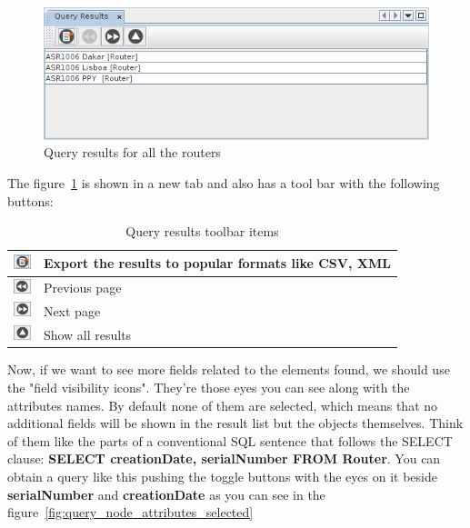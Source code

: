 \documentclass[a4paper]{article}
\begin{document}
	\begin{figure}[h!]
		\centering
		\includegraphics[width=0.9\linewidth]{img/query_results.png}
		\caption{Query results for all the routers}
		\label{fig:query_results}
	\end{figure}
	
	\newpage
	The figure~\ref{fig:query_results} is shown in a new tab and also has a tool bar with the following buttons:
	
	\begin{table}[h!]
		\centering
		\begin{tabular}{cl}
			\includegraphics[width=0.5cm]{img/query_result_export.png} & Export the results to popular formats like CSV, XML\\
			\midrule
			\includegraphics[width=0.5cm]{img/query_results_previous_page.png} & Previous page\\
			\midrule
			\includegraphics[width=0.5cm]{img/query_results_next_page.png} & Next page\\
			\midrule
			\includegraphics[width=0.5cm]{img/query_results_all_results.png} & Show all results\\
		\end{tabular}	
		\caption{Query results toolbar items}
		\label{tab:query_results_toolbar_icons}
	\end{table}
	
	Now, if we want to see more fields related to the  elements found, we should use the "field visibility icons". They're those eyes you can see along with the attributes names. By default none of them are selected, which means that no additional fields will be shown in the result list but the objects themselves. Think of them like the parts of a conventional SQL sentence that follows the SELECT clause: \textbf{SELECT creationDate, serialNumber FROM Router}. You can obtain a query like this pushing the toggle buttons with the eyes on it beside \textbf{serialNumber} and \textbf{creationDate} as you can see in the figure~\ref{fig:query_node_attributes_selected}
	
\end{document}
